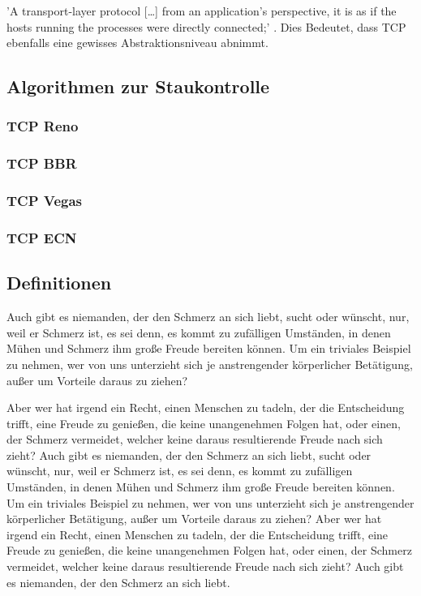 \documentclass[paper=a4,fontsize=12pt,ngerman]{scrartcl}
\begin{document}
'A transport-layer protocol [\dots] from an application’s perspective, it is as if 
the hosts running the processes were directly connected;' \cite[241]{kr22}. 
Dies Bedeutet, dass TCP ebenfalls eine gewisses Abstraktionsniveau abnimmt. 


\subsection{Algorithmen zur Staukontrolle }

\subsubsection{TCP Reno}

\subsubsection{TCP BBR} 

\subsubsection{TCP Vegas}

\subsubsection{TCP ECN}




\subsection{Definitionen}
Auch gibt es niemanden, der den Schmerz an sich liebt, sucht oder wünscht, 
nur, weil er Schmerz ist, es sei denn, es kommt zu zufälligen Umständen, in 
denen Mühen und Schmerz ihm große Freude bereiten können. Um ein triviales 
Beispiel zu nehmen, wer von uns unterzieht sich je anstrengender körperlicher 
Betätigung, außer um Vorteile daraus zu ziehen?

Aber wer hat irgend ein Recht, einen Menschen zu tadeln, der die Entscheidung 
trifft, eine Freude zu genießen, die keine unangenehmen Folgen hat, oder 
einen, der Schmerz vermeidet, welcher keine daraus resultierende Freude nach 
sich zieht? Auch gibt es niemanden, der den Schmerz an sich liebt, sucht oder 
wünscht, nur, weil er Schmerz ist, es sei denn, es kommt zu zufälligen 
Umständen, in denen Mühen und Schmerz ihm große Freude bereiten können. Um 
ein triviales Beispiel zu nehmen, wer von uns unterzieht sich je 
anstrengender körperlicher Betätigung, außer um Vorteile daraus zu ziehen? 
Aber wer hat irgend ein Recht, einen Menschen zu tadeln, der die Entscheidung 
trifft, eine Freude zu genießen, die keine unangenehmen Folgen hat, oder 
einen, der Schmerz vermeidet, welcher keine daraus resultierende Freude nach 
sich zieht? Auch gibt es niemanden, der den Schmerz an sich liebt.
\end{document}
